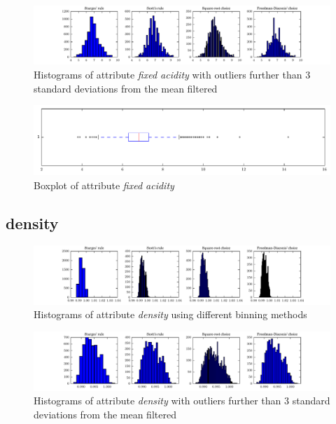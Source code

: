 \documentclass{report}
\begin{document}
\begin{figure}[H]
\includegraphics[width=\textwidth]{histograms/fixed_acidity_filtered.pdf}
\caption{Histograms of attribute \emph{fixed acidity} with outliers further than 3 standard deviations from the mean filtered}
\end{figure}

\begin{figure}[H]
\includegraphics[width=\textwidth]{boxplots/fixed_acidity.pdf}
\caption{Boxplot of attribute \emph{fixed acidity}}\end{figure}

\newpage\subsection{density}
\begin{figure}[H]
\includegraphics[width=\textwidth]{histograms/density.pdf}
\caption{Histograms of attribute \emph{density} using different binning methods}\end{figure}

\begin{figure}[H]
\includegraphics[width=\textwidth]{histograms/density_filtered.pdf}
\caption{Histograms of attribute \emph{density} with outliers further than 3 standard deviations from the mean filtered}
\end{figure}
\end{document}
